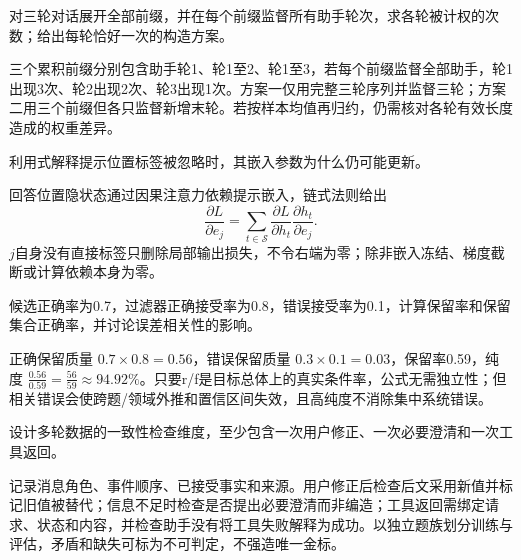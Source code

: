 \begin{exercises}
\begin{exercise} 对三轮对话展开全部前缀，并在每个前缀监督所有助手轮次，求各轮被计权的次数；给出每轮恰好一次的构造方案。

\begin{solution}
三个累积前缀分别包含助手轮1、轮1至2、轮1至3，若每个前缀监督全部助手，轮1出现3次、轮2出现2次、轮3出现1次。方案一仅用完整三轮序列并监督三轮；方案二用三个前缀但各只监督新增末轮。若按样本均值再归约，仍需核对各轮有效长度造成的权重差异。
\end{solution}
\end{exercise}

\begin{exercise} 利用式解释提示位置标签被忽略时，其嵌入参数为什么仍可能更新。

\begin{solution}
回答位置隐状态通过因果注意力依赖提示嵌入，链式法则给出
\[
 \frac{\partial L}{\partial e_j}=\sum_{t\in\mathcal S}\frac{\partial L}{\partial h_t}\frac{\partial h_t}{\partial e_j}.
\]
$j$自身没有直接标签只删除局部输出损失，不令右端为零；除非嵌入冻结、梯度截断或计算依赖本身为零。
\end{solution}
\end{exercise}

\begin{exercise} 候选正确率为0.7，过滤器正确接受率为0.8，错误接受率为0.1，计算保留率和保留集合正确率，并讨论误差相关性的影响。

\begin{solution}
正确保留质量 $0.7\times0.8=0.56$，错误保留质量 $0.3\times0.1=0.03$，保留率0.59，纯度 $\frac{0.56}{0.59}=\frac{56}{59}\approx94.92\%$。只要r/f是目标总体上的真实条件率，公式无需独立性；但相关错误会使跨题/领域外推和置信区间失效，且高纯度不消除集中系统错误。
\end{solution}
\end{exercise}

\begin{exercise}\optional 设计多轮数据的一致性检查维度，至少包含一次用户修正、一次必要澄清和一次工具返回。

\begin{solution}
记录消息角色、事件顺序、已接受事实和来源。用户修正后检查后文采用新值并标记旧值被替代；信息不足时检查是否提出必要澄清而非编造；工具返回需绑定请求、状态和内容，并检查助手没有将工具失败解释为成功。以独立题族划分训练与评估，矛盾和缺失可标为不可判定，不强造唯一金标。
\end{solution}
\end{exercise}


\end{exercises}
